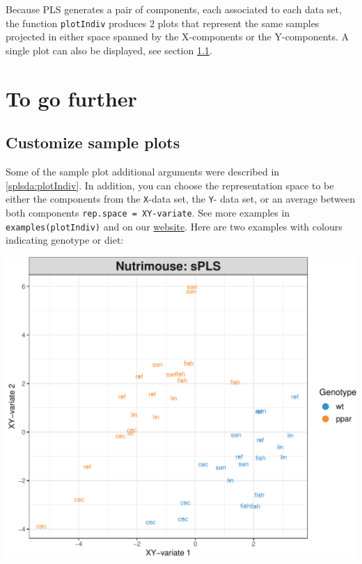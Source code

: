 \documentclass[]{book}
\newenvironment{Shaded}{\begin{snugshade}}{\end{snugshade}}
\newcommand{\DataTypeTok}[1]{\textcolor[rgb]{0.13,0.29,0.53}{#1}}
\newcommand{\KeywordTok}[1]{\textcolor[rgb]{0.13,0.29,0.53}{\textbf{#1}}}
\newcommand{\NormalTok}[1]{#1}
\newcommand{\OperatorTok}[1]{\textcolor[rgb]{0.81,0.36,0.00}{\textbf{#1}}}
\newcommand{\OtherTok}[1]{\textcolor[rgb]{0.56,0.35,0.01}{#1}}
\newcommand{\StringTok}[1]{\textcolor[rgb]{0.31,0.60,0.02}{#1}}
\begin{document}
Because PLS generates a pair of components, each associated to each data set, the function \texttt{plotIndiv} produces 2 plots that represent the same samples projected in either space spanned by the X-components or the Y-components. A single plot can also be displayed, see section \ref{pls:plotIndiv}.

\hypertarget{pls-tgf}{%
\section{To go further}\label{pls-tgf}}

\hypertarget{pls:plotIndiv}{%
\subsection{Customize sample plots}\label{pls:plotIndiv}}

Some of the sample plot additional arguments were described in \ref{splsda:plotIndiv}. In addition, you can choose the representation space to be either the components from the \texttt{X}-data set, the \texttt{Y}- data set, or an average between both components \texttt{rep.space\ =\ \textquotesingle{}XY-variate\textquotesingle{}}. See more examples in \texttt{examples(plotIndiv)} and on our \href{http://mixomics.org/graphics/sample-plots/}{website}. Here are two examples with colours indicating genotype or diet:

\begin{Shaded}
\end{Shaded}

\begin{center}\includegraphics[width=0.5\linewidth,]{Figures/05-pls-plotIndiv-1-1} \end{center}
\end{document}
